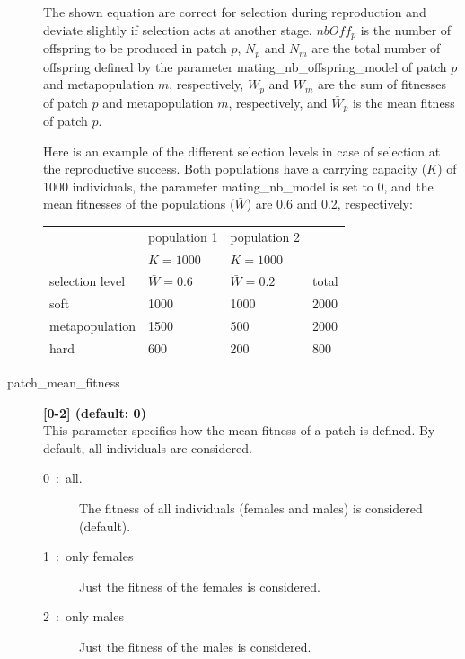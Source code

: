 \documentclass[letterpaper,12pt,oneside]{book}
\begin{document}
\begin{description}
\begin{description}
\end{description}

The shown equation are correct for selection during reproduction and deviate slightly if selection acts at another stage. $nbOff_{p}$ is the number of offspring to be produced in patch $p$, $N_{p}$ and $N_{m}$ are the total number of offspring defined by the parameter \textsf{mating\_nb\_offspring\_model} of patch $p$ and metapopulation $m$, respectively, $W_{p}$ and $W_{m}$ are the sum of fitnesses of patch $p$ and metapopulation $m$, respectively, and $\bar{W}_{p}$ is the mean fitness of patch $p$. 


Here is an example of the different selection levels in case of selection at the reproductive success. Both populations have a carrying capacity ($K$) of 1000 individuals, the parameter \textsf{mating\_nb\_model} is set to 0, and the mean fitnesses of the populations ($\bar{W}$) are 0.6 and 0.2, respectively:\\
\begin{tabular}{llll}
 \hline             & population 1    & population 2   & \\ 
                    & $K = 1000$      & $K = 1000$     & \\
 selection level&   $\bar{W} = 0.6$ & $\bar{W} = 0.2$& total\\
 \hline
 soft               & 1000            & 1000           & 2000\\
 metapopulation     & 1500            & 500            & 2000\\
 hard               & 600             & 200            & 800\\
 \hline
\end{tabular}

\item[patch\_mean\_fitness\index{patch\_mean\_fitness}] \textbf{[0-2] (default: 0)}\\
This parameter specifies how the mean fitness of a patch is defined. By default, all individuals are considered.
\begin{description}
\item [0~:~all.] The fitness of all individuals (females and males) is considered (default).
\item [1~:~only females] Just the fitness of the females is considered.
\item [2~:~only males] Just the fitness of the males is considered.
\end{description}

\end{description}
\end{document}
